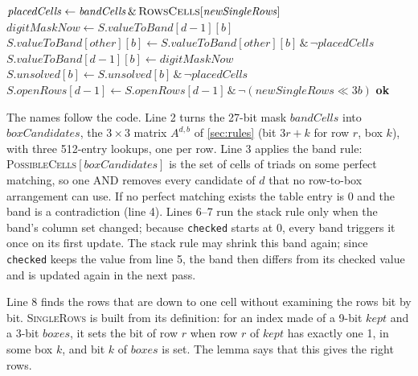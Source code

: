\documentclass[11pt]{article}
\theoremstyle{definition}
\theoremstyle{plain}
\let\origtextsc\textsc
\renewcommand{\textsc}[1]{\textup{\origtextsc{#1}}}
\begin{document}
\begin{algorithm}[H]
\begin{algorithmic}[1]
  \State $\mathit{placedCells} \gets \mathit{bandCells} \,\&\, \textsc{RowsCells}[\mathit{newSingleRows}]$ 
  \State $\mathit{digitMaskNow} \gets S.\mathit{valueToBand}[d-1][b]$ 
   $S.\mathit{valueToBand}[\mathit{other}][b] \gets S.\mathit{valueToBand}[\mathit{other}][b] \,\&\, \lnot\mathit{placedCells}$ \EndFor
  \State $S.\mathit{valueToBand}[d-1][b] \gets \mathit{digitMaskNow}$ 
  \State $S.\mathit{unsolved}[b] \gets S.\mathit{unsolved}[b] \,\&\, \lnot\mathit{placedCells}$
  \Statex \hspace{\algorithmicindent}$S.\mathit{openRows}[d-1] \gets S.\mathit{openRows}[d-1] \,\&\, \lnot(\mathit{newSingleRows}\ll 3b)$
\EndIf
\State \Return \textbf{ok}
\end{algorithmic}
\end{algorithm}



The names follow the code. Line 2 turns the 27-bit mask $\mathit{bandCells}$ into $\mathit{boxCandidates}$, the
$3\times 3$ matrix $A^{d,b}$ of \cref{sec:rules} (bit $3r+k$ for row $r$, box $k$), with three 512-entry lookups, one per
row. Line 3 applies the band rule: \textsc{PossibleCells}$[\mathit{boxCandidates}]$ is the set of cells of triads on
some perfect matching, so one AND removes every candidate of $d$ that no row-to-box arrangement can use. If no perfect matching
exists the table entry is 0 and the band is a contradiction (line 4). Lines 6--7 run the stack rule only when the
band's column set changed; because \texttt{checked} starts at 0, every band triggers it once on its first update. The
stack rule may shrink this band again; since \texttt{checked} keeps the value from line 5, the band then differs from
its checked value and is updated again in the next pass.

Line 8 finds the rows that are down to one cell without examining the rows bit by bit. \textsc{SingleRows} is
built from its definition: for an index made of a 9-bit $\mathit{kept}$ and a 3-bit $\mathit{boxes}$, it sets the bit
of row $r$ when row $r$ of $\mathit{kept}$ has exactly one 1, in some box $k$, and bit $k$ of $\mathit{boxes}$ is set.
The lemma says that this gives the right rows.
\end{document}
